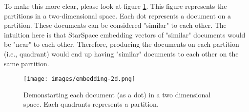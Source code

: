 To make this more clear, please look at figure \ref{fig:embedding-space}. This figure represents the partitions in a two-dimensional space. Each dot represents a document on a partition. These documents can be considered "similar" to each other. The intuition here is that StarSpace embedding vectors of "similar" documents would be "near" to each other. Therefore, producing the documents on each partition (i.e., quadrant) would end up having "similar" documents to each other on the same partition.


\begin{figure}[!h]
    \centering
    \texttt{[image: images/embedding-2d.png]}
    \caption{Demonstarting each document (as a dot) in a two dimensional space. Each quadrants represents a partition.}
    \label{fig:embedding-space}
\end{figure}


